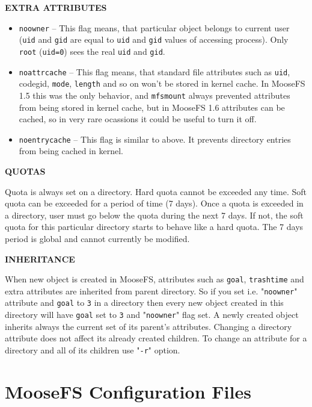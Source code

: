 \documentclass[a4paper,11pt,english]{report}
\def\code#1{\texttt{#1}}
\begin{document}
				\textbf{EXTRA ATTRIBUTES}
				\begin{itemize}
					\item \code{noowner} -- This flag means, that particular object belongs to current user
					(\code{uid}  and  \code{gid}  are  equal to \code{uid} and \code{gid} values of accessing process). Only \code{root} (\code{uid=0}) sees the real \code{uid} and \code{gid}.

					\item \code{noattrcache} -- This flag means, that standard file attributes such as \code{uid}, code{gid}, \code{mode}, \code{length} and so on won't be stored in kernel cache. In MooseFS 1.5  this  was  the  only  behavior,  and  \code{mfsmount}  always  prevented attributes  from  being  stored  in  kernel  cache,  but in MooseFS 1.6 attributes can be cached, so in very rare ocassions it could be  useful to turn it off.

					\item \code{noentrycache} --  This  flag  is  similar  to  above. It prevents directory entries from being cached in kernel.
				\end{itemize}
				\bigskip
				
				\textbf{QUOTAS}
				
					Quota is always set on a directory. Hard quota cannot be exceeded  any
					time.  Soft quota can be exceeded for a period of time (7 days). Once a
					quota is exceeded in a directory, user must go below the  quota  during
					the  next  7 days. If not, the soft quota for this particular directory
					starts to behave like a hard quota. The 7 days  period  is  global  and
					cannot currently be modified.
				\bigskip
				
				\textbf{INHERITANCE}
				
					When  new object is created in MooseFS, attributes such as \code{goal}, \code{trashtime}
					and extra attributes are inherited from parent  directory.  So  if
					you  set  i.e.  "\code{noowner}"  attribute  and \code{goal} to \code{3} in a directory then
					every new object created in this directory will have \code{goal} set to \code{3}  and
					"\code{noowner}"  flag set. A newly created object inherits always the current
					set of its parent's attributes. Changing a directory attribute does not
					affect  its  already  created  children.  To  change an attribute for a
					directory and all of its children use "\code{-r}" option.
	
	\chapter{MooseFS Configuration Files}
\end{document}
